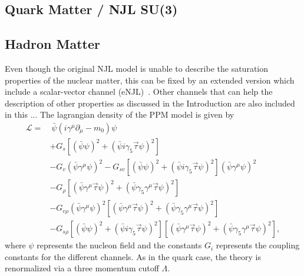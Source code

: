 \documentclass[prc, reprint, amsmath, floatfix, linenumbers,10pt]{revtex4-1}
\begin{document}
\subsection{Quark Matter / NJL SU(3)}

\subsection{Hadron Matter}

Even though the original NJL model is unable to describe the saturation properties of the nuclear matter, this can be fixed by an extended version which include a scalar-vector channel (eNJL)~\cite{Koch1987}. Other channels that can help the description of other properties as discussed in the Introduction are also included in this ... The lagrangian density of the PPM model is given by~\cite{Pais2016}
\begin{equation}\label{Eq:Lagrangiana_eNLJ_Pais}
\begin{split}
	\mathcal{L} =&~ \bar{\psi}(i\gamma^\mu\partial_\mu - m_0)\psi \\
	& + G_s[(\bar{\psi}\psi)^2 + (\bar{\psi}i\gamma_5\vec{\tau}\psi)^2] \\
	& - G_v(\bar{\psi}\gamma^\mu\psi)^2 - G_{sv}[(\bar{\psi}\psi)^2 + (\bar{\psi}i\gamma_5\vec{\tau}\psi)^2](\bar{\psi}\gamma^\mu\psi)^2 \\
	& - G_\rho[(\bar{\psi}\gamma^\mu\vec{\tau}\psi)^2 + (\bar{\psi}\gamma_5\gamma^\mu\vec{\tau}\psi)^2] \\
	& - G_{v\rho}(\bar{\psi}\gamma^\mu\psi)^2[(\bar{\psi}\gamma^\mu\vec{\tau}\psi)^2 + (\bar{\psi}\gamma_5\gamma^\mu\vec{\tau}\psi)^2] \\
	& - G_{s\rho} [(\bar{\psi}\psi)^2 + (\bar{\psi}i\gamma_5\vec{\tau}\psi)^2][(\bar{\psi}\gamma^\mu\vec{\tau}\psi)^2 + (\bar{\psi}\gamma_5\gamma^\mu\vec{\tau}\psi)^2],
\end{split}
\end{equation}
%
where $\psi$ represents the nucleon field and the constants $G_i$ represents the coupling constants for the different channels. As in the quark case, the theory is renormalized via a three momentum cutoff $\Lambda$.
\end{document}
